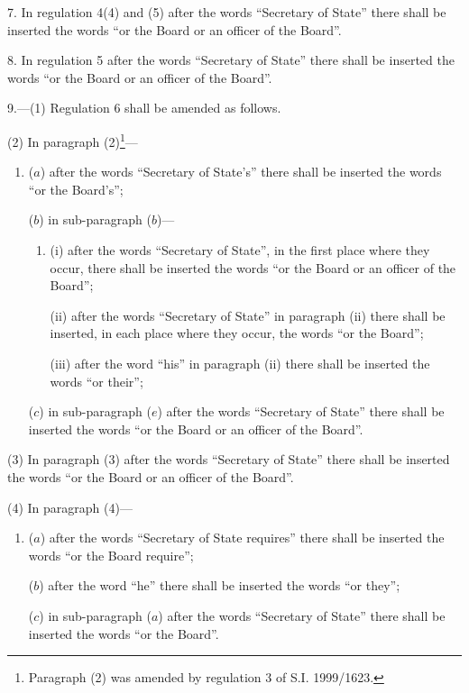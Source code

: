 \documentclass[12pt,a4paper]{article}
\begin{document}
\medskip

7.  In regulation 4(4) and (5) after the words “Secretary of State” there shall be inserted the words “or the Board or an officer of the Board”.

\medskip

8.  In regulation 5 after the words “Secretary of State” there shall be inserted the words “or the Board or an officer of the Board”.

\medskip

9.---(1)  Regulation 6 shall be amended as follows.

(2) In paragraph (2)\footnote{\frenchspacing Paragraph (2) was amended by regulation 3 of S.I. 1999/1623.}—
\begin{enumerate}\item[]
($a$) after the words “Secretary of State's” there shall be inserted the words “or the Board's”;

($b$) in sub-paragraph ($b$)—
\begin{enumerate}\item[]
(i) after the words “Secretary of State”, in the first place where they occur, there shall be inserted the words “or the Board or an officer of the Board”;

(ii) after the words “Secretary of State” in paragraph (ii)  there shall be inserted, in each place where they occur, the words “or the Board”;

(iii) after the word “his” in paragraph (ii)  there shall be inserted the words “or their”;
\end{enumerate}

($c$) in sub-paragraph ($e$)  after the words “Secretary of State” there shall be inserted the words “or the Board or an officer of the Board”.
\end{enumerate}

(3) In paragraph (3) after the words “Secretary of State” there shall be inserted the words “or the Board or an officer of the Board”.

(4) In paragraph (4)—
\begin{enumerate}\item[]
($a$) after the words “Secretary of State requires” there shall be inserted the words “or the Board require”;

($b$) after the word “he” there shall be inserted the words “or they”;

($c$) in sub-paragraph ($a$)  after the words “Secretary of State” there shall be inserted the words “or the Board”.
\end{enumerate}
\end{document}
